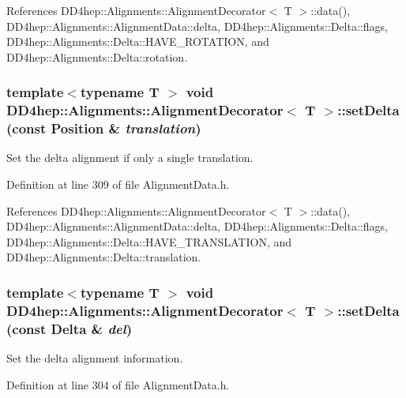 References DD4hep::Alignments::AlignmentDecorator$<$ T $>$::data(), DD4hep::Alignments::AlignmentData::delta, DD4hep::Alignments::Delta::flags, DD4hep::Alignments::Delta::HAVE\_\-ROTATION, and DD4hep::Alignments::Delta::rotation.\hypertarget{class_d_d4hep_1_1_alignments_1_1_alignment_decorator_a46ef14105fac953846eba7dc798f3357}{
\subsubsection[{setDelta}]{\setlength{\rightskip}{0pt plus 5cm}template$<$typename T $>$ void {\bf DD4hep::Alignments::AlignmentDecorator}$<$ {\bf T} $>$::setDelta (const Position \& {\em translation})}}
\label{class_d_d4hep_1_1_alignments_1_1_alignment_decorator_a46ef14105fac953846eba7dc798f3357}


Set the delta alignment if only a single translation. 

Definition at line 309 of file AlignmentData.h.

References DD4hep::Alignments::AlignmentDecorator$<$ T $>$::data(), DD4hep::Alignments::AlignmentData::delta, DD4hep::Alignments::Delta::flags, DD4hep::Alignments::Delta::HAVE\_\-TRANSLATION, and DD4hep::Alignments::Delta::translation.\hypertarget{class_d_d4hep_1_1_alignments_1_1_alignment_decorator_a6eec8976056b3a07c214ad809f403b67}{
\subsubsection[{setDelta}]{\setlength{\rightskip}{0pt plus 5cm}template$<$typename T $>$ void {\bf DD4hep::Alignments::AlignmentDecorator}$<$ {\bf T} $>$::setDelta (const {\bf Delta} \& {\em del})}}
\label{class_d_d4hep_1_1_alignments_1_1_alignment_decorator_a6eec8976056b3a07c214ad809f403b67}


Set the delta alignment information. 

Definition at line 304 of file AlignmentData.h.

